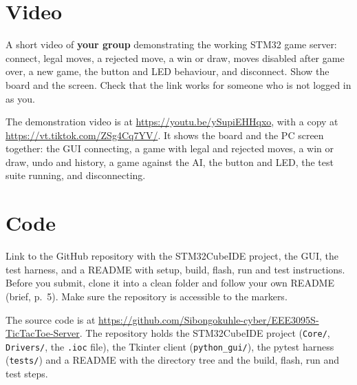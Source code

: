 \section{Video}
\label{sec:video}

\begin{guidance}
A short video of \textbf{your group} demonstrating the working STM32 game
server: connect, legal moves, a rejected move, a win or draw, moves disabled
after game over, a new game, the button and LED behaviour, and disconnect.
Show the board and the screen. Check that the link works for someone who is
not logged in as you.
\end{guidance}

The demonstration video is at \url{https://youtu.be/ySupiEHHqxo}, with a copy at
\url{https://vt.tiktok.com/ZSg4Cq7YV/}. It shows the board and the PC screen together:
the GUI connecting, a game with legal and rejected moves, a win or draw, undo and
history, a game against the AI, the button and LED, the test suite running, and
disconnecting.

\section{Code}
\label{sec:code}

\begin{guidance}
Link to the GitHub repository with the STM32CubeIDE project, the GUI, the test
harness, and a README with setup, build, flash, run and test instructions.
Before you submit, clone it into a clean folder and follow your own README
(brief, p.~5). Make sure the repository is accessible to the markers.
\end{guidance}

The source code is at
\url{https://github.com/Sibongokuhle-cyber/EEE3095S-TicTacToe-Server}. The repository holds the
STM32CubeIDE project (\texttt{Core/}, \texttt{Drivers/}, the \texttt{.ioc} file),
the Tkinter client (\texttt{python\_gui/}), the pytest harness (\texttt{tests/})
and a README with the directory tree and the build, flash, run and test steps.
